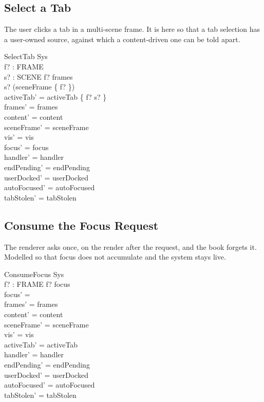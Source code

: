 \documentclass[a4paper,10pt,fleqn]{article}
\begin{document}
\subsection{Select a Tab}

The user clicks a tab in a multi-scene frame.  It is here so that a tab
selection has a user-owned source, against which a content-driven one can be
told apart.

\begin{schema}{SelectTab}
  \Delta Sys \\
  f? : FRAME \\
  s? : SCENE
\where
  f? \in frames \\
  s? \in \dom (sceneFrame \rres \{ f? \}) \\
  activeTab' = activeTab \oplus \{ f? \mapsto s? \} \\
  frames' = frames \\
  content' = content \\
  sceneFrame' = sceneFrame \\
  vis' = vis \\
  focus' = focus \\
  handler' = handler \\
  endPending' = endPending \\
  userDocked' = userDocked \\
  autoFocused' = autoFocused \\
  tabStolen' = tabStolen
\end{schema}

\subsection{Consume the Focus Request}

The renderer asks once, on the render after the request, and the book forgets
it.  Modelled so that focus does not accumulate and the system stays live.

\begin{schema}{ConsumeFocus}
  \Delta Sys \\
  f? : FRAME
\where
  f? \in focus \\
  focus' = \emptyset \\
  frames' = frames \\
  content' = content \\
  sceneFrame' = sceneFrame \\
  vis' = vis \\
  activeTab' = activeTab \\
  handler' = handler \\
  endPending' = endPending \\
  userDocked' = userDocked \\
  autoFocused' = autoFocused \\
  tabStolen' = tabStolen
\end{schema}
\end{document}
